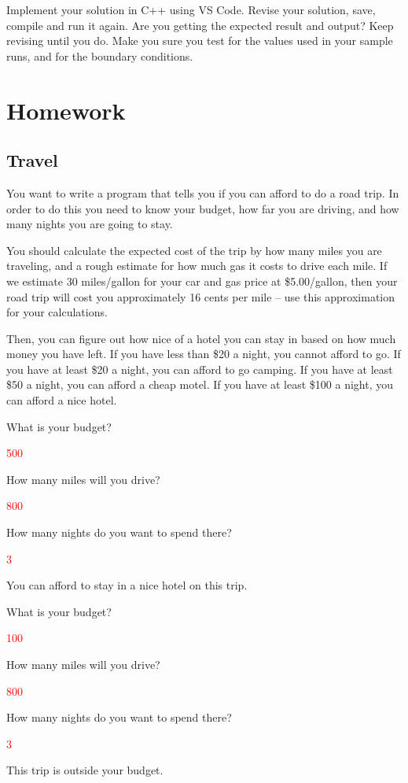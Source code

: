 \begin{multipart}
     Implement your solution in C++ using VS Code. Revise your solution, save, compile and run it again. Are you getting the expected result and output? Keep revising until you do. Make you sure you test for the values used in your sample runs, and for the boundary conditions.
\end{multipart}

\section{Homework}

\subsection{Travel}

You want to write a program that tells you if you can afford to do a road trip. In order to do this you need to know your budget, how far you are driving, and how many nights you are going to stay. 

You should calculate the expected cost of the trip by how many miles you are traveling, and a rough estimate for how much gas it costs to drive each mile. If we estimate 30 miles/gallon for your car and gas price at \$5.00/gallon, then your road trip will cost you approximately 16 cents per mile -- use this approximation for your calculations.

Then, you can figure out how nice of a hotel you can stay in based on how much money you have left. If you have less than \$20 a night, you cannot afford to go. If you have at least \$20 a night, you can afford to go camping. If you have at least \$50 a night, you can afford a cheap motel. If you have at least \$100 a night, you can afford a nice hotel. 

\begin{sample}
What is your budget?

\textcolor{red}{500}

How many miles will you drive?

\textcolor{red}{800}

How many nights do you want to spend there?

\textcolor{red}{3}

You can afford to stay in a nice hotel on this trip.
\end{sample}

\begin{sample}
What is your budget?

\textcolor{red}{100}

How many miles will you drive?

\textcolor{red}{800}

How many nights do you want to spend there?

\textcolor{red}{3}

This trip is outside your budget.
\end{sample}

